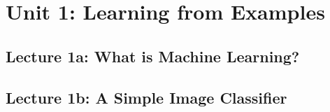 \documentclass[12pt]{article}
\begin{document}
    \newpage

  \section*{\sc Unit 1: Learning from Examples}
    \subsection*{Lecture 1a: What is Machine Learning?}
      \subsubsection*{}
      \subsubsection*{}
      \subsubsection*{}
      \subsubsection*{}
      \subsubsection*{}
    \newpage

    \subsection*{Lecture 1b: A Simple Image Classifier}
      \subsubsection*{}
      \subsubsection*{}
      \subsubsection*{}
      \subsubsection*{}
      \subsubsection*{}
    \newpage
\end{document}
